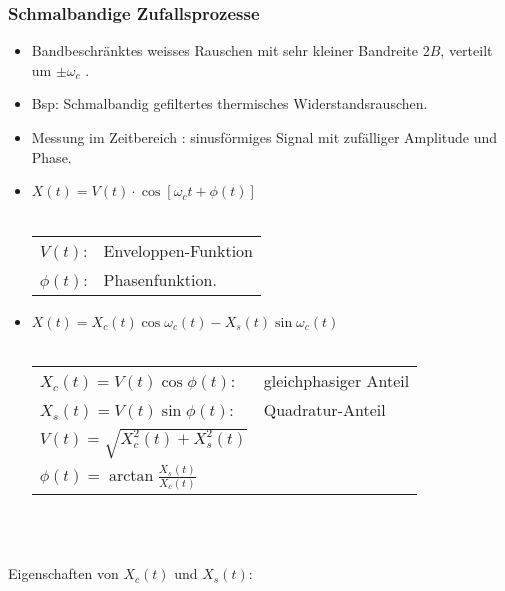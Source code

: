 \documentclass[10pt, a4paper]{article}
\begin{document}
\subsubsection{Schmalbandige Zufallsprozesse}
\begin{itemize}
  \item Bandbeschr\"anktes weisses Rauschen mit sehr kleiner Bandreite $2B$,
        verteilt um $\pm\omega_{c}$ .
  \item Bsp: Schmalbandig gefiltertes thermisches Widerstandsrauschen.
  \item Messung im Zeitbereich : sinusf\"ormiges Signal mit zuf\"alliger Amplitude und Phase.
  \item $X(t) = V(t) \cdot \cos \left[ \omega_{c}t + \phi(t) \right]$ \\ \\
        \begin{tabular}{ll}
        $V(t)$: & Enveloppen-Funktion \\ 
        $\phi(t)$: & Phasenfunktion.
        \end{tabular} 
  \item $X(t) = X_{c}(t)\cos\omega_{c}(t) - X_{s}(t)\sin\omega_{c}(t)$ \\ \\
        \begin{tabular}{ll}
        $X_{c}(t) = V(t)\cos\phi(t)$: & gleichphasiger Anteil \\ 
        $X_{s}(t) = V(t)\sin\phi(t)$: & Quadratur-Anteil \\ 
        $V(t) = \sqrt{X^{2}_{c}(t) + X^{2}_{s}(t)}$ \\
        $\phi(t) = \arctan \frac{X_{s}(t)}{X_{c}(t)}$ \\
        \end{tabular} \\ \\
\end{itemize} 
Eigenschaften von $X_{c}(t)$ und $X_{s}(t)$: \\
\end{document}
